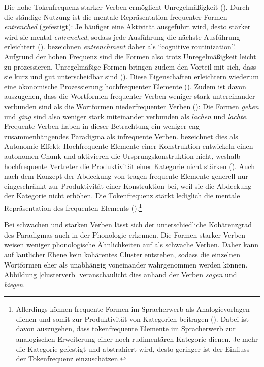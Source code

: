 Die hohe Tokenfrequenz starker Verben ermöglicht Unregelmäßigkeit (\cite[166]{Ellis.2002b}). Durch die ständige Nutzung ist die mentale Repräsentation frequenter Formen \textit{entrenched} (gefestigt): Je häufiger eine Aktivität ausgeführt wird, desto stärker wird sie mental \textit{en\-trenched}, sodass jede Ausführung die nächste Ausführung erleichtert (\cites[380]{Bybee.1997}[13]{Schneider.2014}). \textcite[x]{Kemmer.2000} bezeichnen \textit{entrenchment} daher als "`cognitive routinization"'. Aufgrund der hohen Frequenz sind die Formen also trotz Unregelmäßigkeit leicht zu prozessieren. Unregelmäßige Formen bringen zudem den Vorteil mit sich, dass sie kurz und gut unterscheidbar sind (\cites[42--43]{Werner.1989}[226--227]{Nubling.2000}). Diese Eigenschaften erleichtern wiederum eine ökonomische Prozessierung hochfrequenter Elemente (\cite[174]{Nowak.2013}). Zudem ist davon auszugehen, dass die Wortformen frequenter Verben weniger stark untereinander verbunden sind als die Wortformen niederfrequenter Verben (\cite[117--124]{Bybee.1985}): Die Formen \textit{gehen} und \textit{ging} sind also weniger stark miteinander verbunden als \textit{lachen} und \textit{lachte}. Frequente Verben haben in dieser Betrachtung ein weniger eng zusammenhängendes Paradigma als infrequente Verben. \textcite[715]{Bybee.2006b} bezeichnet dies als Autonomie-Effekt: Hochfrequente Elemente einer Konstruktion entwickeln einen autonomen Chunk und aktivieren die Ursprungskon\-struk\-tion nicht, weshalb hochfrequente Vertreter die Produktivität einer Kategorie nicht stärken (\cite[62]{Bybee.2013}). Auch nach dem Konzept der Abdeckung von \textcite{Goldberg.2019} tragen frequente Elemente generell nur eingeschränkt zur Produktivität einer Konstruktion bei, weil sie die Abdeckung der Kategorie nicht erhöhen. Die Tokenfrequenz stärkt lediglich die mentale Repräsentation des frequenten Elements (\cite[68]{Goldberg.2019}).\footnote{Allerdings können frequente Formen im Spracherwerb als Analogievorlagen dienen und somit zur Produktivität von Kategorien beitragen (\cite[242]{Ellis.2016}). Dabei ist davon auszugehen, dass tokenfrequente Elemente im Spracherwerb zur analogischen Erweiterung einer noch rudimentären Kategorie dienen. Je mehr die Kategorie gefestigt und abstrahiert wird, desto geringer ist der Einfluss der Tokenfrequenz einzuschätzen.}

Bei schwachen und starken Verben lässt sich der unterschiedliche Kohärenzgrad des Paradigmas auch in der Phonologie erkennen. Die Formen starker Verben weisen weniger phonologische Ähnlichkeiten auf als schwache Verben. Daher kann auf lautlicher Ebene kein kohärentes Cluster entstehen, sodass die einzelnen Wortformen eher als unabhängig voneinander wahrgenommen werden können. Abbildung \ref{clusterverb} veranschaulicht dies anhand der Verben \textit{sagen} und \textit{biegen}. 

